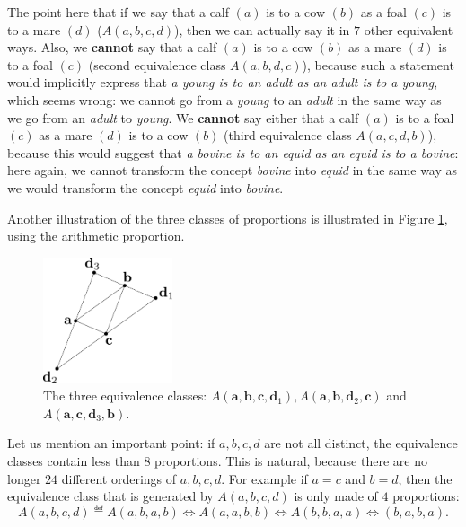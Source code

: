 \begin{testexample}
  The point here that if we say that a calf $(a)$ is to a cow $(b)$ as a foal
  $(c)$ is to a mare $(d)$ ($A(a, b, c, d)$), then we can actually say it in
  $7$ other equivalent ways. Also, we \textbf{cannot} say that a calf $(a)$ is
  to a cow $(b)$ as a mare $(d)$ is to a foal $(c)$ (second equivalence class
  $A(a, b, d, c)$), because such a statement would implicitly express that
  \textit{a young is to an adult as an adult is to a young}, which seems wrong:
  we cannot go from a \textit{young} to an \textit{adult} in the same way as we
  go from an \textit{adult} to \textit{young}.  We \textbf{cannot} say either
  that a calf $(a)$ is to a foal $(c)$ as a  mare $(d)$  is to a cow $(b)$
  (third equivalence class $A(a, c, d, b)$), because this would suggest that
  \textit{a bovine is to an equid as an equid is to a bovine}: here again, we
  cannot transform the concept \textit{bovine} into \textit{equid} in the same
  way as we would transform the concept \textit{equid} into \textit{bovine}.
\end{testexample}

\noindent
Another illustration of the three classes of proportions is illustrated in
Figure \ref{FIG:3_classes}, using the arithmetic proportion.
\begin{figure}[!h]
\centering
  \includegraphics[width=1.5in]{figures/three_classes.pdf}
  \caption{The three equivalence classes: $A(\mathbf{a}, \mathbf{b},
  \mathbf{c}, \mathbf{d}_1), A(\mathbf{a}, \mathbf{b}, \mathbf{d}_2,
  \mathbf{c})$ and $A(\mathbf{a}, \mathbf{c}, \mathbf{d}_3,\mathbf{b})$.}
\label{FIG:3_classes}
\end{figure}

Let us mention an important point: if $a, b, c, d$ are not all distinct, the
equivalence classes contain less than $8$ proportions. This is natural,
because there are no longer $24$ different orderings of $a, b, c, d$. For
example if $a = c$ and $b = d$, then the equivalence class that is generated by
$A(a, b, c, d)$ is only made of $4$ proportions:
$$A(a, b, c, d) \eqdef A(a, b, a, b) \iff A(a, a, b, b) \iff A(b, b, a, a) \iff
(b, a, b, a).$$

